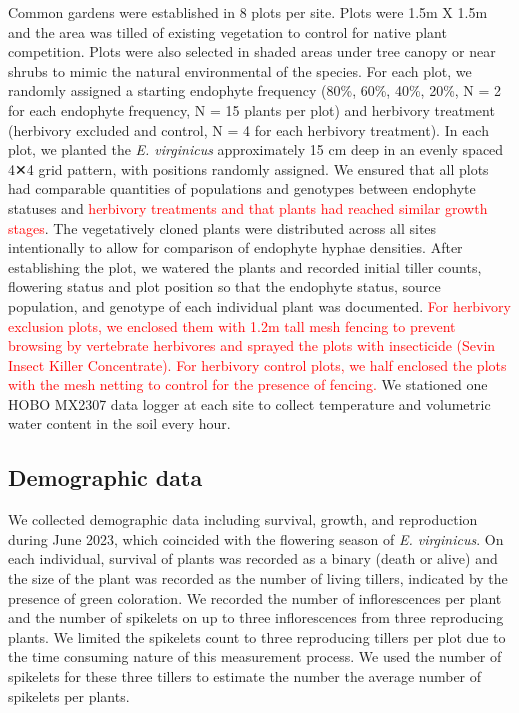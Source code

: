 \documentclass[11pt]{article}
\begin{document}
Common gardens were established in 8 plots per site. 
Plots were 1.5m X 1.5m and the area was tilled of existing vegetation to control for native plant competition.
Plots were also selected in shaded areas under tree canopy or near shrubs to mimic the natural environmental of the species.
For each plot, we randomly assigned a starting endophyte frequency (80\%, 60\%, 40\%, 20\%, N = 2 for each endophyte frequency, N = 15 plants per plot) and herbivory treatment (herbivory excluded and control, N = 4 for each herbivory treatment). 
In each plot, we planted the \emph{E. virginicus} approximately 15 cm deep in an evenly spaced 4✕4 grid pattern, with positions randomly assigned. 
We ensured that all plots had comparable quantities of populations and genotypes between endophyte statuses and  \textcolor{red} {herbivory treatments and that plants had reached similar growth stages}.
The vegetatively cloned plants were distributed across all sites intentionally to allow for comparison of endophyte hyphae densities. 
After establishing the plot, we watered the plants and recorded initial tiller counts, flowering status and plot position so that the endophyte status, source population, and genotype of each individual plant was documented. 
\textcolor{red} {For herbivory exclusion plots, we enclosed them with 1.2m tall mesh fencing to prevent browsing by vertebrate herbivores and sprayed the plots with insecticide (Sevin Insect Killer Concentrate). 
For herbivory control plots, we half enclosed the plots with the mesh netting to control for the presence of fencing.}
We stationed one HOBO MX2307 data logger at each site to collect temperature and volumetric water content in the soil every hour. 



\subsection*{Demographic data}
We collected demographic data including survival, growth, and reproduction during June 2023, which coincided with the flowering season of \emph{E. virginicus}. 
On each individual, survival of plants was recorded as a binary (death or alive) and the size of the plant was recorded as the number of living tillers, indicated by the presence of green coloration. 
We recorded the number of inflorescences per plant and the number of spikelets on up to three inflorescences from three reproducing plants.
We limited the spikelets count to three reproducing tillers per plot due to the time consuming nature of this measurement process. 
We used the number of spikelets for these three tillers to estimate the number the average number of spikelets per plants.
\end{document}
